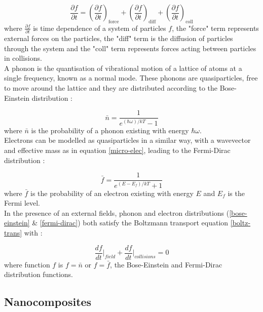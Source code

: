 \documentclass[a4paper,10pt,journal]{IEEEtran}
\begin{document}
\begin{equation}
\label{boltz-trans}
	\frac{\partial f}{\partial t} = \left(\frac{\partial f}{\partial
	t}\right)_\mathrm{force} + \left(\frac{\partial f}{\partial t}\right)_\mathrm{diff}+ \left(\frac{\partial f}{\partial t}\right)_\mathrm{coll}
\end{equation}
where $\frac{\partial f}{\partial t}$ is time dependence of a system
of particles $f$, the "force" term represents external forces on the
particles, the "diff" term is the diffusion of particles through the
system and the "coll" term represents forces acting between particles
in collisions.\\
A phonon is the quantisation of vibrational motion of a lattice of
atoms at a single frequency, known as a normal mode. These phonons are
quasiparticles, free to move around the lattice and they are
distributed according to the Bose-Einstein distribution \cite{kittel}:

\begin{equation}
\label{bose-einstein}
	 \bar{n} = \frac{1}{e^{(\hbar \omega) / k T} - 1}
\end{equation}
where $\bar{n}$ is the probability of a phonon existing with energy
$\hbar \omega$.\\
Electrons can be modelled as quasiparticles in a similar way, with a
wavevector and effective mass as in equation \eqref{micro-elec},
leading to the Fermi-Dirac distribution \cite{kittel}:

\begin{equation}
\label{fermi-dirac}
	 \bar{f} = \frac{1}{e^{(E - E_f) / k T} + 1}
\end{equation}
where $\bar{f}$ is the probability of an electron existing with energy
$E$ and $E_f$ is the Fermi level.\\
In the presence of an external fields, phonon and electron
distributions (\eqref{bose-einstein} \& \eqref{fermi-dirac}) both
satisfy the Boltzmann transport equation \eqref{boltz-trans} with
\cite{ziman}:

\begin{equation}
\label{boltz-specific}
	\frac{df}{dt}\bigg|_{field} + \frac{df}{dt}\bigg|_{collisions} = 0
\end{equation}
where function $f$ is $f = \bar{n}$ or $f = \bar{f}$, the Bose-Einstein
and Fermi-Dirac distribution functions.

\subsection{Nanocomposites}
\end{document}
